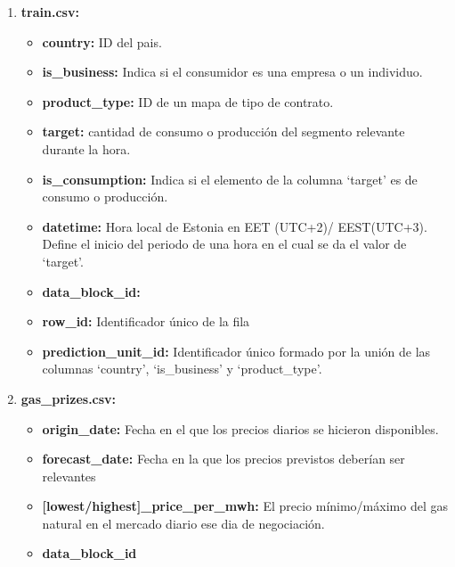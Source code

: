 \documentclass[a4paper,12pt]{article}
\begin{document}
\begin{enumerate}
    \item \textbf{train.csv:}
    \begin{itemize}
        \item \textbf{country:} 
        ID del pais.
        \item \textbf{is\_business:}
        Indica si el consumidor es una empresa o
        un individuo.
        \item \textbf{product\_type:}
        ID de un mapa de tipo de contrato.
        \item \textbf{target:} 
        cantidad de consumo o producción del 
        segmento relevante durante la hora. 
        \item \textbf{is\_consumption:}
        Indica si el elemento de la columna 
        `target' es de consumo o producción.
        \item \textbf{datetime:}
        Hora local de Estonia en EET (UTC+2)/
        EEST(UTC+3). Define el inicio del periodo
        de una hora en el cual se da el valor de 
        `target'.
        \item \textbf{data\_block\_id:}
        
        \item \textbf{row\_id:}
        Identificador único de la fila
        \item \textbf{prediction\_unit\_id:}
        Identificador único formado por la unión de
        las columnas `country', `is\_business' y 
        `product\_type'.
    \end{itemize}
    
    \item \textbf{gas\_prizes.csv:}
    \begin{itemize}
        \item \textbf{origin\_date:}
        Fecha en el que los precios diarios
        se hicieron disponibles.
        \item \textbf{forecast\_date:}
        Fecha en la que los precios previstos
        deberían ser relevantes
        \item \textbf{[lowest/highest]\_price\_per\_mwh:}
        El precio mínimo/máximo del gas natural en el 
        mercado diario ese dia de negociación.
        \item \textbf{data\_block\_id}
    \end{itemize}


\end{enumerate}
\end{document}
